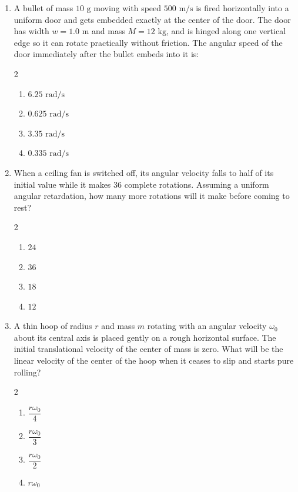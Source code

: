 \documentclass[11pt,a4paper]{article}
\begin{document}
\begin{enumerate}[label=\textbf{Q\arabic*.},leftmargin=24pt,itemsep=12pt]
  \item A bullet of mass $10\text{ g}$ moving with speed $500\text{ m/s}$ is fired horizontally into a uniform door and gets embedded exactly at the center of the door. The door has width $w = 1.0\text{ m}$ and mass $M = 12\text{ kg}$, and is hinged along one vertical edge so it can rotate practically without friction. The angular speed of the door immediately after the bullet embeds into it is:
  \begin{multicols}{2}
  \begin{enumerate}[label=(\Alph*),itemsep=2pt]
    \item $6.25\text{ rad/s}$
    \item $0.625\text{ rad/s}$
    \item $3.35\text{ rad/s}$
    \item $0.335\text{ rad/s}$
  \end{enumerate}
  \end{multicols}

  \item When a ceiling fan is switched off, its angular velocity falls to half of its initial value while it makes $36$ complete rotations. Assuming a uniform angular retardation, how many more rotations will it make before coming to rest?
  \begin{multicols}{2}
  \begin{enumerate}[label=(\Alph*),itemsep=2pt]
    \item $24$
    \item $36$
    \item $18$
    \item $12$
  \end{enumerate}
  \end{multicols}

  \item A thin hoop of radius $r$ and mass $m$ rotating with an angular velocity $\omega_0$ about its central axis is placed gently on a rough horizontal surface. The initial translational velocity of the center of mass is zero. What will be the linear velocity of the center of the hoop when it ceases to slip and starts pure rolling?
  \begin{multicols}{2}
  \begin{enumerate}[label=(\Alph*),itemsep=2pt]
    \item $\dfrac{r\omega_0}{4}$
    \item $\dfrac{r\omega_0}{3}$
    \item $\dfrac{r\omega_0}{2}$
    \item $r\omega_0$
  \end{enumerate}
  \end{multicols}


\end{enumerate}
\end{document}

